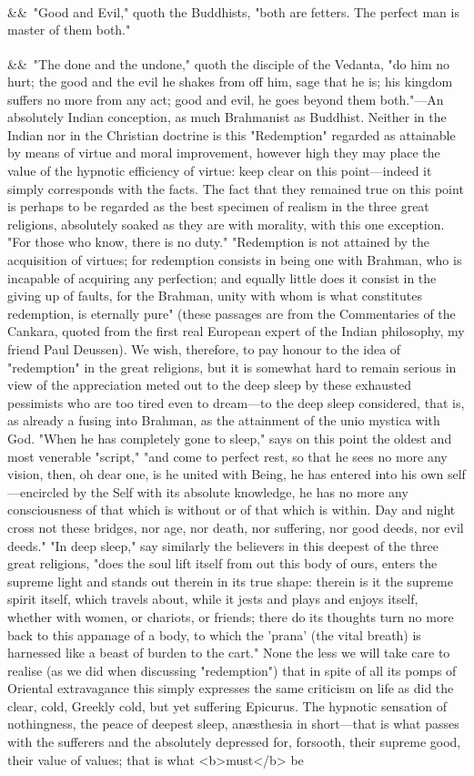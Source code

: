 \documentclass[12pt]{article}
\newcommand{\para}[1][]{\par\noindent\ifx&#1&\else\textsuperscript{\footnotesize #1}~\fi}
\begin{document}
\para "Good and Evil," quoth the Buddhists, "both are fetters. The perfect man is master of them both."

\para "The done and the undone," quoth the disciple of the Vedanta, "do him no hurt; the good and the evil he shakes from off him, sage that he is; his kingdom suffers no more from any act; good and evil, he goes beyond them both."---An absolutely Indian conception, as much Brahmanist as Buddhist. Neither in the Indian nor in the Christian doctrine is this "Redemption" regarded as attainable by means of virtue and moral improvement, however high they may place the value of the hypnotic efficiency of virtue: keep clear on this point---indeed it simply corresponds with the facts. The fact that they remained true on this point is perhaps to be regarded as the best specimen of realism in the three great religions, absolutely soaked as they are with morality, with this one exception. "For those who know, there is no duty." "Redemption is not attained by the acquisition of virtues; for redemption consists in being one with Brahman, who is incapable of acquiring any perfection; and equally little does it consist in the giving up of faults, for the Brahman, unity with whom is what constitutes redemption, is eternally pure" (these passages are from the Commentaries of the Cankara, quoted from the first real European expert of the Indian philosophy, my friend Paul Deussen). We wish, therefore, to pay honour to the idea of "redemption" in the great religions, but it is somewhat hard to remain serious in view of the appreciation meted out to the deep sleep by these exhausted pessimists who are too tired even to dream---to the deep sleep considered, that is, as already a fusing into Brahman, as the attainment of the unio mystica with God. "When he has completely gone to sleep," says on this point the oldest and most venerable "script," "and come to perfect rest, so that he sees no more any vision, then, oh dear one, is he united with Being, he has entered into his own self---encircled by the Self with its absolute knowledge, he has no more any consciousness of that which is without or of that which is within. Day and night cross not these bridges, nor age, nor death, nor suffering, nor good deeds, nor evil deeds." "In deep sleep," say similarly the believers in this deepest of the three great religions, "does the soul lift itself from out this body of ours, enters the supreme light and stands out therein in its true shape: therein is it the supreme spirit itself, which travels about, while it jests and plays and enjoys itself, whether with women, or chariots, or friends; there do its thoughts turn no more back to this appanage of a body, to which the 'prana' (the vital breath) is harnessed like a beast of burden to the cart." None the less we will take care to realise (as we did when discussing "redemption") that in spite of all its pomps of Oriental extravagance this simply expresses the same criticism on life as did the clear, cold, Greekly cold, but yet suffering Epicurus. The hypnotic sensation of nothingness, the peace of deepest sleep, anæsthesia in short---that is what passes with the sufferers and the absolutely depressed for, forsooth, their supreme good, their value of values; that is what <b>must</b> be 
\end{document}
